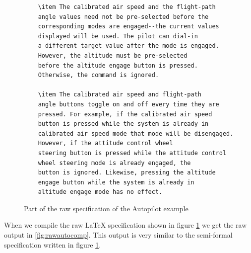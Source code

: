 \begin{figure}[H]
\begin{minipage}{0.45\textwidth}
\begin{tiny}
\begin{BVerbatim}
    \item The calibrated air speed and the flight-path 
    angle values need not be pre-selected before the
    corresponding modes are engaged--the current values
    displayed will be used. The pilot can dial-in
    a different target value after the mode is engaged. 
    However, the altitude must be pre-selected
    before the altitude engage button is pressed. 
    Otherwise, the command is ignored.
                       
    \item The calibrated air speed and flight-path 
    angle buttons toggle on and off every time they are
    pressed. For example, if the calibrated air speed 
    button is pressed while the system is already in
    calibrated air speed mode that mode will be disengaged.
    However, if the attitude control wheel
    steering button is pressed while the attitude control
    wheel steering mode is already engaged, the
    button is ignored. Likewise, pressing the altitude 
    engage button while the system is already in
    altitude engage mode has no effect.
     \end{BVerbatim}
    \end{tiny}
     \vspace{-0.2in}
     \vspace{-0.2in}
     \end{minipage}
     \caption{Part of the raw specification of the Autopilot example \label{fig:rawauto}}
     \end{figure}

When we compile the raw \LaTeX{} specification shown in figure \ref{fig:rawauto}
we get the raw output in \ref{fig:rawautocomp}. This output is very similar to the semi-formal
specification written in figure \ref{fig:rawauto}.

